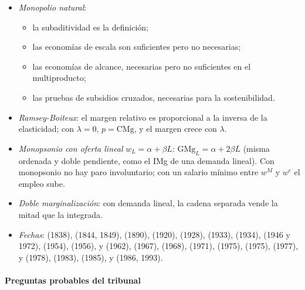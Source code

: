 \documentclass[11pt]{article}
\begin{document}
\begin{itemize}
\item \emph{Monopolio natural}:
  \begin{itemize}
  \item la subaditividad es la definición;
  \item las economías de escala son suficientes pero no necesarias;
  \item las economías de alcance, necesarias pero no suficientes en el multiproducto;
  \item las pruebas de subsidios cruzados, necesarias para la sostenibilidad.
  \end{itemize}
\item \emph{Ramsey-Boiteux}: el margen relativo es proporcional a la inversa de la elasticidad; con $\lambda=0$, $p=\mathrm{CMg}$, y el margen crece con $\lambda$.
\item \emph{Monopsonio con oferta lineal} $w_L=\alpha+\beta L$: $\mathrm{GMg}_L=\alpha+2\beta L$ (misma ordenada y doble pendiente, como el IMg de una demanda lineal). Con monopsonio no hay paro involuntario; con un salario mínimo entre $w^M$ y $w^c$ el empleo sube.
\item \emph{Doble marginalización}: con demanda lineal, la cadena separada vende la mitad que la integrada.
\item \emph{Fechas}:  (1838),  (1844, 1849),  (1890),  (1920),  (1928),  (1933),  (1934),  (1946 y 1972),  (1954),  (1956),  y  (1962),  (1967),  (1968),  (1971),  (1975),  (1975),  (1977),  y  (1978),  (1983),  (1985),  y  (1986, 1993).
\end{itemize}

\paragraph{Preguntas probables del tribunal}
\end{document}
